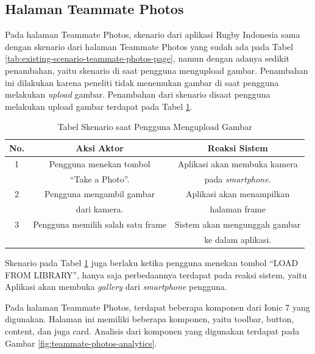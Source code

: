 \subsection{Halaman Teammate Photos}
Pada halaman Teammate Photos, skenario dari aplikasi Rugby Indonesia sama dengan skenario dari halaman Teammate Photos yang sudah ada pada Tabel \ref{tab:existing-scenario-teammate-photos-page}, namun dengan adanya sedikit penambahan, yaitu skenario di saat pengguna mengupload gambar. Penambahan ini dilakukan karena peneliti tidak menemukan gambar di saat pengguna melakukan \textit{upload} gambar. Penambahan dari skenario disaat pengguna melakukan upload gambar terdapat pada Tabel \ref{tab:usulan-skenario-halaman-teammate-photos}.
\begin{table} [H]
    \centering
    \caption{Tabel Skenario saat Pengguna Mengupload Gambar}
    \begin{tabular}{|c|c|c|}
    \hline
       No. & Aksi Aktor & Reaksi Sistem  \\ \hline
        1 & Pengguna menekan tombol  & Aplikasi akan membuka kamera \\
         & ``Take a Photo''. & pada \textit{smartphone}. \\ \hline
        2 & Pengguna mengambil gambar & Aplikasi akan menampilkan \\ 
         & dari kamera. & halaman frame \\ \hline
        3 & Pengguna memilih salah satu frame &  Sistem akan mengunggah gambar \\
         & & ke dalam aplikasi. \\ \hline
    \end{tabular}
    \label{tab:usulan-skenario-halaman-teammate-photos}
\end{table}

Skenario pada Tabel \ref{tab:usulan-skenario-halaman-teammate-photos} juga berlaku ketika pengguna menekan tombol ``LOAD FROM LIBRARY'', hanya saja perbedaannya terdapat pada reaksi sistem, yaitu Aplikasi akan membuka \textit{gallery} dari \textit{smartphone} pengguna.

Pada halaman Teammate Photos, terdapat beberapa komponen dari Ionic 7 yang digunakan. Halaman ini memiliki beberapa komponen, yaitu toolbar, button, content, dan juga card. Analisis dari komponen yang digunakan terdapat pada Gambar \ref{fig:teammate-photos-analytics}.


